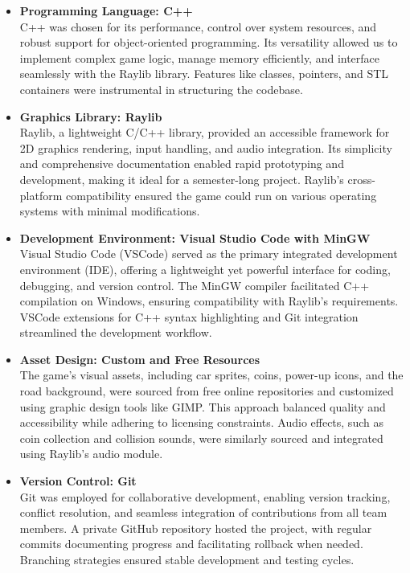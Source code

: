 \documentclass[12pt,a4paper]{article}
\begin{document}
\begin{itemize}
    \item \textbf{Programming Language: C++} \\
    C++ was chosen for its performance, control over system resources, and robust support for object-oriented programming. Its versatility allowed us to implement complex game logic, manage memory efficiently, and interface seamlessly with the Raylib library. Features like classes, pointers, and STL containers were instrumental in structuring the codebase. \\
    
    \item \textbf{Graphics Library: Raylib} \\
    Raylib, a lightweight C/C++ library, provided an accessible framework for 2D graphics rendering, input handling, and audio integration. Its simplicity and comprehensive documentation enabled rapid prototyping and development, making it ideal for a semester-long project. Raylib’s cross-platform compatibility ensured the game could run on various operating systems with minimal modifications. \\
    
    \item \textbf{Development Environment: Visual Studio Code with MinGW} \\
    Visual Studio Code (VSCode) served as the primary integrated development environment (IDE), offering a lightweight yet powerful interface for coding, debugging, and version control. The MinGW compiler facilitated C++ compilation on Windows, ensuring compatibility with Raylib’s requirements. VSCode extensions for C++ syntax highlighting and Git integration streamlined the development workflow. \\
    
    \item \textbf{Asset Design: Custom and Free Resources} \\
    The game’s visual assets, including car sprites, coins, power-up icons, and the road background, were sourced from free online repositories and customized using graphic design tools like GIMP. This approach balanced quality and accessibility while adhering to licensing constraints. Audio effects, such as coin collection and collision sounds, were similarly sourced and integrated using Raylib’s audio module. \\
    
    \item \textbf{Version Control: Git} \\
    Git was employed for collaborative development, enabling version tracking, conflict resolution, and seamless integration of contributions from all team members. A private GitHub repository hosted the project, with regular commits documenting progress and facilitating rollback when needed. Branching strategies ensured stable development and testing cycles. \\
\end{itemize}
\end{document}
